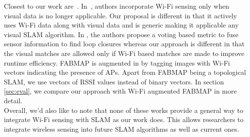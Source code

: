 Closest to our work are~\cite{visual-wifi-ratslam,visual_wifi_3,visual_wifi_2}. %
In~\cite{visual-wifi-ratslam}, authors incorporate Wi-Fi sensing only when visual data is no longer applicable. Our proposal is different in that it actively uses Wi-Fi data along with visual data and is generic making it applicable any visual SLAM algorithm.
In \cite{visual_wifi_3}, the authors propose a voting based metric to fuse sensor information to find loop closures whereas our approach is different in that the visual matches are allowed only if Wi-Fi based matches are made to improve runtime efficiency.
FABMAP is augmented in \cite{visual_wifi_2} by tagging images with Wi-Fi vectors indicating the presence of APs. Apart from FABMAP being a topological SLAM, we use vectors of RSSI values instead of binary vectors. In section \ref{sec:eval}, we compare our approach with Wi-Fi augmented FABMAP in more detail.\\
Overall, we'd also like to note that none of these works provide a general way to integrate Wi-Fi sensing with SLAM as our work does. This allows researchers to integrate wireless sensing into future SLAM algorithms as well as current ones. 



